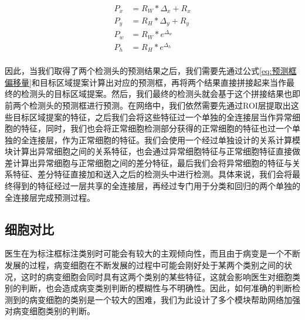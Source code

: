\begin{equation}
    \begin{aligned}
        P_x & = R_W * \Delta_x + R_x \\
        P_y & = R_H * \Delta_y + R_y \\
        P_w & = R_W * e^{\Delta_w}   \\
        P_h & = R_H * e^{\Delta_h}   \\
    \end{aligned}
    \label{eq:预测框偏移量}
\end{equation}
\par 因此，当我们取得了两个检测头的预测结果之后，我们需要先通过公式\ref{eq:预测框偏移量}和目标区域提案计算出对应的预测框，再将两个结果直接拼接起来当作最终的检测头的目标区域提案。然后，我们最终的检测头就会基于这个拼接结果也即前两个检测头的预测框进行预测。在网络中，我们依然需要先通过ROI层提取出这些目标区域提案的特征，之后我们会将这些特征过一个单独的全连接层当作异常细胞的特征，同时，我们也会将正常细胞检测部分获得的正常细胞的特征也过一个单独的全连接层，作为正常细胞的特征。我们会使用一个经过单独设计的关系计算模块计算出异常细胞之间的关系特征，也会通过异常细胞特征与正常细胞特征直接做差计算出异常细胞与正常细胞之间的差分特征，最后我们会将异常细胞的特征与关系特征、差分特征直接加和送入之后的检测头中进行检测。具体来说，我们会将最终得到的特征经过一层共享的全连接层，再经过专门用于分类和回归的两个单独的全连接层完成预测过程。

\subsection{细胞对比}
\par 医生在为标注框标注类别时可能会有较大的主观倾向性，而且由于病变是一个不断发展的过程，病变细胞在不断发展的过程中可能会刚好处于某两个类别之间的状况，这时的病变细胞会同时具有这两个类别的某些特征，这就会影响医生对细胞类别的判断，也会造成病变类别判断的模糊性与不明确性。因此，如何准确的判断检测到的病变细胞的类别是一个较大的困难，我们为此设计了多个模块帮助网络加强对病变细胞类别的判断。

